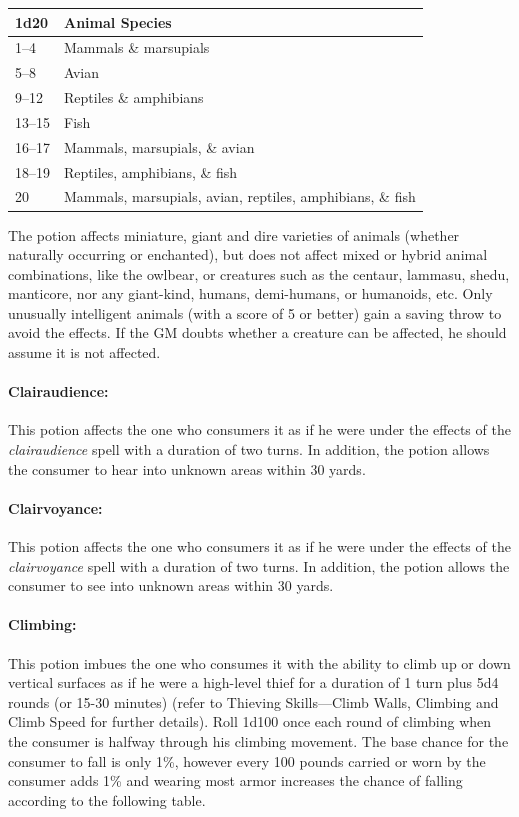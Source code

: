 \begin{multicols}{2}
\noindent
\begin{tabular}{|p{}|p{}|}
\hline
1d20	& Animal Species \\
\hline\hline
\rowcolor[gray]{.9}1--4	& Mammals \& marsupials \\
5--8	& Avian \\
\rowcolor[gray]{.9}9--12	& Reptiles \& amphibians \\
13--15	& Fish \\
\rowcolor[gray]{.9}16--17	& Mammals, marsupials, \& avian \\
18--19	& Reptiles, amphibians, \& fish \\
\rowcolor[gray]{.9}20	& Mammals, marsupials, avian, reptiles, amphibians, \& fish \\
\hline
\end{tabular}

The potion affects miniature, giant and dire varieties of animals (whether naturally occurring or enchanted), but does not affect mixed or hybrid animal combinations, like the owlbear, or creatures such as the centaur, lammasu, shedu, manticore, nor any giant-kind, humans, demi-humans, or humanoids, etc.  Only unusually intelligent animals (with a score of 5 or better) gain a saving throw to avoid the effects.  If the GM doubts whether a creature can be affected, he should assume it is not affected.

\paragraph{Clairaudience:} This potion affects the one who consumers it as if he were under the effects of the \textit{clairaudience} spell with a duration of two turns.  In addition, the potion allows the consumer to hear into unknown areas within 30 yards. 

\paragraph{Clairvoyance:} This potion affects the one who consumers it as if he were under the effects of the \textit{clairvoyance} spell with a duration of two turns.  In addition, the potion allows the consumer to see into unknown areas within 30 yards. 

\paragraph{Climbing:} This potion imbues the one who consumes it with the ability to climb up or down vertical surfaces as if he were a high-level thief for a duration of 1 turn plus 5d4 rounds (or 15-30 minutes) (refer to Thieving Skills---Climb Walls, Climbing and Climb Speed for further details).  Roll 1d100 once each round of climbing when the consumer is halfway through his climbing movement.  The base chance for the consumer to fall is only 1\%, however every 100 pounds carried or worn by the consumer adds 1\% and wearing most armor increases the chance of falling according to the following table.


\end{multicols}
